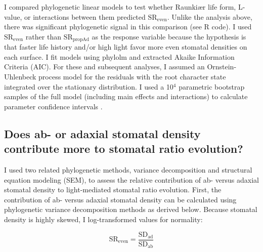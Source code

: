 \documentclass[12pt, oneside]{article}
\newcommand{\pkg}[1]{{\fontseries{b}\selectfont #1}}
\newcommand{\el}{L-value}
\begin{document}
I compared phylogenetic linear models to test whether Raunki\ae r life form, \el, or interactions between them predicted $\textrm{SR}_\textrm{even}$. Unlike the analysis above, there was significant phylogenetic signal in this comparison (see R code). I used $\textrm{SR}_\textrm{even}$ rather than $\textrm{SR}_\textrm{propAd}$ as the response variable because the hypothesis is that faster life history and/or high light favor more even stomatal densities on each surface. I fit models using \pkg{phylolm} and extracted Akaike Information Criteria (AIC). For these and subsequent analyses, I assumed an Ornstein-Uhlenbeck process model for the residuals with the root character state integrated over the stationary distribution. I used a 10$^4$ parametric bootstrap samples of the full model (including main effects and interactions) to calculate parameter confidence intervals \citep{Boettiger_etal_2012}. %

\subsection*{Does ab- or adaxial stomatal density contribute more to stomatal ratio evolution?}

I used two related phylogenetic methods, variance decomposition and structural equation modeling (SEM), to assess the relative contribution of ab- versus adaxial stomatal density to light-mediated stomatal ratio evolution. First, the contribution of ab- versus adaxial stomatal density can be calculated using phylogenetic variance decomposition methods as derived below. Because stomatal density is highly skewed, I log-transformed values for normality:
 
\begin{equation} \label{eq:SReven2} 
  \mathrm{SR_{even}} = \frac{\mathrm{SD_{ad}}}{\mathrm{SD_{ab}}}
\end{equation}
\end{document}
